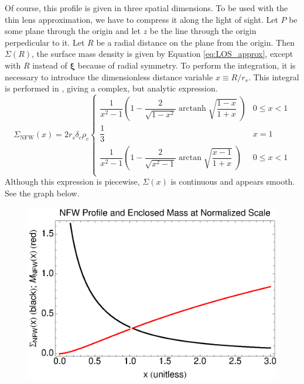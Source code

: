 \documentclass[10pt,twoside]{article}
\theoremstyle{definition}
\theoremstyle{exercise}
\renewcommand{\v}[1]{\boldsymbol{#1}}%
\DeclareMathOperator\arctanh{arctanh}
\begin{document}
Of course, this profile is given in three spatial dimensions. To be used with the thin lens approximation, we have to compress it along the light of sight. Let $P$ be some plane through the origin and let $z$ be the line through the origin perpedicular to it. Let $R$ be a radial distance on the plane from the origin. Then $\Sigma(R)$, the surface mass density is given by Equation \eqref{eq:LOS_approx}, except with $R$ instead of $\v{\xi}$ because of radial symmetry. To perform the integration, it is necessary to introduce the dimensionless distance variable $x \equiv R/r_s$. This integral is performed in \cite{brainerd_wright}, giving a complex, but analytic expression.
\begin{equation}
		\Sigma_\text{NFW}(x) = 2r_s \delta_c \rho_c
		\begin{cases}
				\dfrac{1}{x^2-1}\left( 1-\dfrac{2}{\sqrt{1-x^2}} \arctanh \sqrt{\dfrac{1-x}{1+x}}\; \right) & 0 \le x < 1\\[1.2em]
				\dfrac{1}{3} & x=1\\[1.2em]
				\dfrac{1}{x^2-1}\left( 1-\dfrac{2}{\sqrt{x^2-1}} \arctan \sqrt{\dfrac{x-1}{1+x}}\; \right) & 0 \le x < 1\\
		\end{cases}
		\label{eq:NFW_surface_mass_density}
\end{equation}
Although this expression is piecewise, $\Sigma(x)$ is continuous and appears smooth. See the graph below.
\begin{figure}[h]
\center
\includegraphics{images/NFW_Profile.eps}
\end{figure}
\end{document}
